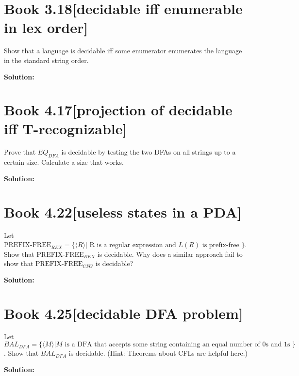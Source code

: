 \documentclass[11pt]{article}
\newenvironment{question}[2]
{\newpage\section{#1\texorpdfstring{\hfill}{horizontal spacing}{\rm\normalsize #2}}}{}
\newenvironment{solution}
{\textbf{Solution: }\color{blue}}
{\color{black}}
\begin{document}

\begin{question}{Book 3.18}{[decidable iff enumerable in lex order]}

Show that a language is decidable iff some enumerator enumerates the language in the standard string order.

\begin{solution}



\end{solution}
\end{question}


\begin{question}{Book 4.17}{[projection of decidable iff T-recognizable]}

Prove that \(EQ_{DFA}\) is decidable by testing the two DFAs on all strings up to a certain size. Calculate a size that works.

\begin{solution}



\end{solution}
\end{question}


\begin{question}{Book 4.22}{[useless states in a PDA]}

Let \(\text{PREFIX-FREE}_{REX} = \{ \langle R \rangle | \text{ R is a regular expression and } L(R) \text{ is prefix-free } \}\). Show that \(\text{PREFIX-FREE}_{REX}\) is decidable. Why does a similar approach fail to show that \(\text{PREFIX-FREE}_{CFG}\) is decidable?

\begin{solution}



\end{solution}
\end{question}


\begin{question}{Book 4.25}{[decidable DFA problem]}

Let \(BAL_{DFA} = \{ \langle M \rangle | M \text{ is a DFA that accepts some string containing an equal number of 0s and 1s } \}\). Show that \(BAL_{DFA}\) is decidable. (Hint: Theorems about CFLs are helpful here.)

\begin{solution}



\end{solution}
\end{question}
\end{document}
